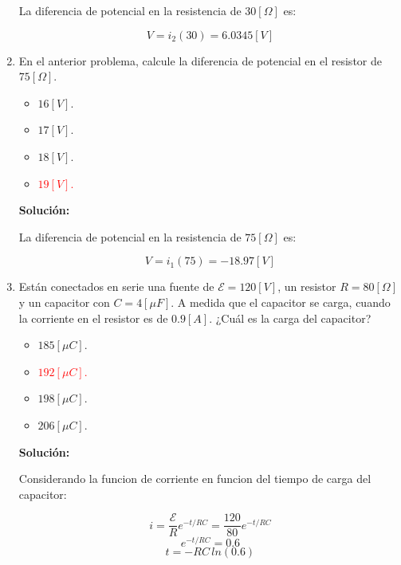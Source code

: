 \documentclass[letter,11pt]{article}
\begin{document}
\begin{enumerate}
La diferencia de potencial en la resistencia de $30 [\Omega]$ es:

\begin{equation*}
    V = i_2 (30) = 6.0345 [V]
\end{equation*}

\item En el anterior problema, calcule la diferencia de potencial en el resistor
de $75 [\Omega]$.

\begin{itemize}
    \item $16 [V]$.
    \item $17 [V]$.
    \item $18 [V]$.
    \item \textcolor{red}{$19 [V]$.}
\end{itemize}

\textbf{Solución:}

La diferencia de potencial en la resistencia de $75 [\Omega]$ es:

\begin{equation*}
    V = i_1 (75) = -18.97 [V]
\end{equation*}

\item Están conectados en serie una fuente de $\mathcal{E} = 120 [V]$, un
resistor $R = 80 [\Omega]$ y un capacitor con $C = 4 [\mu F]$. A medida que el
capacitor se carga, cuando la corriente en el resistor es de $0.9 [A]$. ¿Cuál es
la carga del capacitor?

\begin{itemize}
    \item $185 [\mu C]$.
    \item \textcolor{red}{$192 [\mu C]$.}
    \item $198 [\mu C]$.
    \item $206 [\mu C]$.
\end{itemize}

\textbf{Solución:}

Considerando la funcion de corriente en funcion del tiempo de carga del
capacitor:

\begin{equation*}
    i = \frac{\mathcal{E}}{R} e^{-t/RC}
      = \frac{120}{80} e^{-t/RC}
\end{equation*}
\begin{equation*}
    e^{-t/RC}=0.6
\end{equation*}
\begin{equation*}
    t = -RC\,ln(0.6)
\end{equation*}


\end{enumerate}
\end{document}

